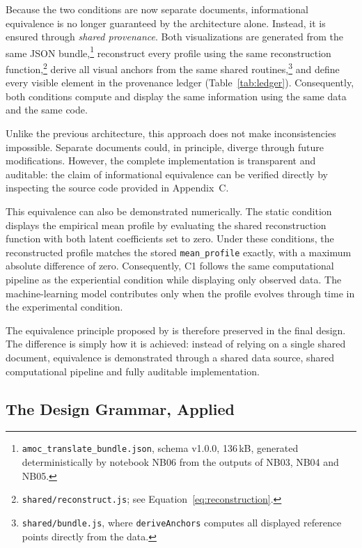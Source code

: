 Because the two conditions are now separate documents, informational equivalence is no longer guaranteed by the architecture alone. Instead, it is ensured through \emph{shared provenance}. Both visualizations are generated from the same JSON bundle,\footnote{\texttt{amoc\_translate\_bundle.json}, schema v1.0.0, 136\,kB, generated deterministically by notebook NB06 from the outputs of NB03, NB04 and NB05.} reconstruct every profile using the same reconstruction function,\footnote{\texttt{shared/reconstruct.js}; see Equation~\ref{eq:reconstruction}.} derive all visual anchors from the same shared routines,\footnote{\texttt{shared/bundle.js}, where \texttt{deriveAnchors} computes all displayed reference points directly from the data.} and define every visible element in the provenance ledger (Table~\ref{tab:ledger}). Consequently, both conditions compute and display the same information using the same data and the same code.

Unlike the previous architecture, this approach does not make inconsistencies impossible. Separate documents could, in principle, diverge through future modifications. However, the complete implementation is transparent and auditable: the claim of informational equivalence can be verified directly by inspecting the source code provided in Appendix~C.

This equivalence can also be demonstrated numerically. The static condition displays the empirical mean profile by evaluating the shared reconstruction function with both latent coefficients set to zero. Under these conditions, the reconstructed profile matches the stored \texttt{mean\_profile} exactly, with a maximum absolute difference of zero. Consequently, C1 follows the same computational pipeline as the experiential condition while displaying only observed data. The machine-learning model contributes only when the profile evolves through time in the experimental condition.

The equivalence principle proposed by \textcite{tversky2002} is therefore preserved in the final design. The difference is simply how it is achieved: instead of relying on a single shared document, equivalence is demonstrated through a shared data source, shared computational pipeline and fully auditable implementation.

\subsection{The Design Grammar, Applied}
\label{sec:grammar}

